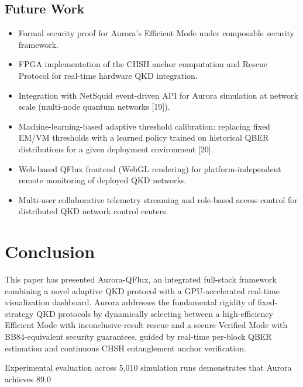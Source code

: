 {{{{{{\subsection{Future Work}
\begin{itemize}
\item Formal security proof for Aurora's Efficient Mode under composable security framework.
\item FPGA implementation of the CHSH anchor computation and Rescue Protocol for real-time hardware QKD integration.
\item Integration with NetSquid event-driven API for Aurora simulation at network scale (multi-node quantum networks [19]).
\item Machine-learning-based adaptive threshold calibration: replacing fixed EM/VM thresholds with a learned policy trained on historical QBER distributions for a given deployment environment [20].
\item Web-based QFlux frontend (WebGL rendering) for platform-independent remote monitoring of deployed QKD networks.
\item Multi-user collaborative telemetry streaming and role-based access control for distributed QKD network control centers.
\end{itemize}


\section{Conclusion}
This paper has presented Aurora-QFlux, an integrated full-stack framework combining a novel adaptive QKD protocol with a GPU-accelerated real-time visualization dashboard. Aurora addresses the fundamental rigidity of fixed-strategy QKD protocols by dynamically selecting between a high-efficiency Efficient Mode with inconclusive-result rescue and a secure Verified Mode with BB84-equivalent security guarantees, guided by real-time per-block QBER estimation and continuous CHSH entanglement anchor verification.

Experimental evaluation across 5,010 simulation runs demonstrates that Aurora achieves 89.0%

}}}}}}
